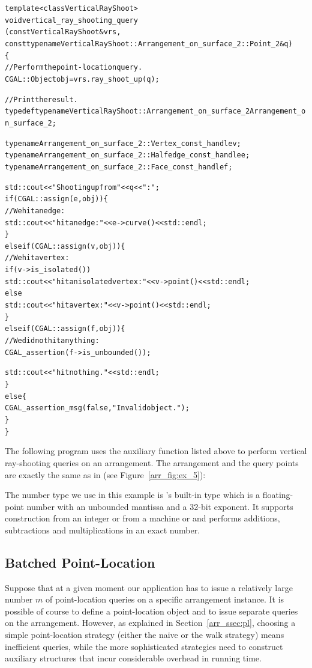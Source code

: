 \begin{alltt}
template <class VerticalRayShoot>
void vertical_ray_shooting_query
    (const VerticalRayShoot& vrs,
     const typename VerticalRayShoot::Arrangement_on_surface_2::Point_2& q)
\{
  // Perform the point-location query.
  CGAL::Object    obj = vrs.ray_shoot_up (q);

  // Print the result.
  typedef typename VerticalRayShoot::Arrangement_on_surface_2  Arrangement_on_surface_2;

  typename Arrangement_on_surface_2::Vertex_const_handle    v;
  typename Arrangement_on_surface_2::Halfedge_const_handle  e;
  typename Arrangement_on_surface_2::Face_const_handle      f;

  std::cout << "Shooting up from " << q << " : ";
  if (CGAL::assign (e, obj)) \{
    // We hit an edge:
    std::cout << "hit an edge: " << e->curve() << std::endl;
  \}
  else if (CGAL::assign (v, obj)) \{
    // We hit a vertex:
    if (v->is_isolated())
      std::cout << "hit an isolated vertex: " << v->point() << std::endl;
    else
      std::cout << "hit a vertex: " << v->point() << std::endl;
  \}
  else if (CGAL::assign (f, obj)) \{
    // We did not hit anything:
    CGAL_assertion (f->is_unbounded());

    std::cout << "hit nothing." << std::endl;
  \}
  else \{
    CGAL_assertion_msg (false, "Invalid object.");
  \}
\}
\end{alltt}

The following program uses the auxiliary function listed above to
perform vertical ray-shooting queries on an arrangement.
The arrangement and the query points are exactly the same as in
 (see Figure~\ref{arr_fig:ex_5}):


The number type we use in this example is \cgal's built-in
 type which is a floating-point number with an
unbounded mantissa and a 32-bit exponent. It supports construction from an
integer or from a machine  or  and performs additions,
subtractions and multiplications in an exact number.

\subsection{Batched Point-Location\label{arr_ssec:batched_pl}}

Suppose that at a given moment our application has to issue a
relatively large number $m$ of point-location queries on a
specific arrangement instance. It is possible of course to define
a point-location object and to issue separate queries on the
arrangement. However, as explained in Section~\ref{arr_ssec:pl},
choosing a simple point-location strategy (either the naive or
the walk strategy) means inefficient queries, while the more
sophisticated strategies need to construct auxiliary structures
that incur considerable overhead in running time.

